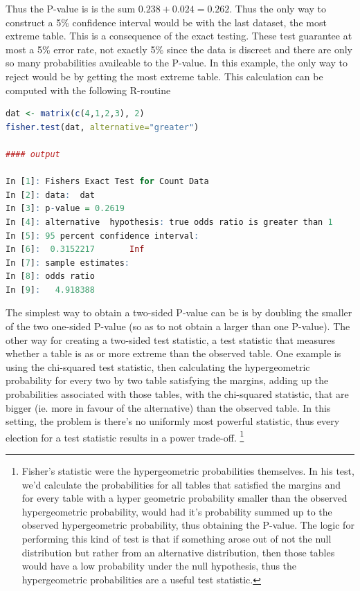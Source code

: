 \documentclass{homework}
\begin{document}
Thus the P-value is is the sum $0.238 + 0.024 = 0.262$. Thus the only way to construct a 5\% confidence interval would be with the last dataset, the most extreme table. This is a consequence of the exact testing. These test guarantee at most a 5\% error rate, not exactly 5\% since the data is discreet and there are only so many probabilities availeable to the P-value. In this example, the only way to reject would be by getting the most extreme table. This calculation can be computed with the following R-routine

\begin{lstlisting}[language=R]
dat <- matrix(c(4,1,2,3), 2)
fisher.test(dat, alternative="greater")

#### output 

In [1]: Fishers Exact Test for Count Data
In [2]: data:  dat
In [3]: p-value = 0.2619
In [4]: alternative  hypothesis: true odds ratio is greater than 1
In [5]: 95 percent confidence interval:
In [6]:  0.3152217       Inf
In [7]: sample estimates:
In [8]: odds ratio 
In [9]:   4.918388 
\end{lstlisting}

The simplest way to obtain a two-sided P-value can be is by doubling the smaller of the two one-sided P-value (so as to not obtain a larger than one P-value). The other way for creating a two-sided test statistic, a test statistic that measures whether a table is as or more extreme than the observed table. One example is using the chi-squared test statistic, then calculating the hypergeometric probability for every two by two table satisfying the margins, adding up the probabilities associated with those tables, with the chi-squared statistic, that are bigger (ie. more in favour of the alternative) than the observed table. In this setting, the problem is there's no uniformly most powerful statistic, thus 
every election for a test statistic results in a power trade-off. \footnote{Fisher's  statistic were the hypergeometric probabilities themselves. In his test, we'd calculate the probabilities for all tables that satisfied the margins and for every table with a hyper geometric probability smaller than the observed hypergeometric probability, would had it's probability summed up to the observed hypergeometric probability, thus obtaining the P-value. The logic for performing this kind of test is that if something arose out of not the null distribution but rather from an alternative distribution, then those tables would have a low probability under the null hypothesis, thus the hypergeometric probabilities are a useful test statistic.}
\end{document}
